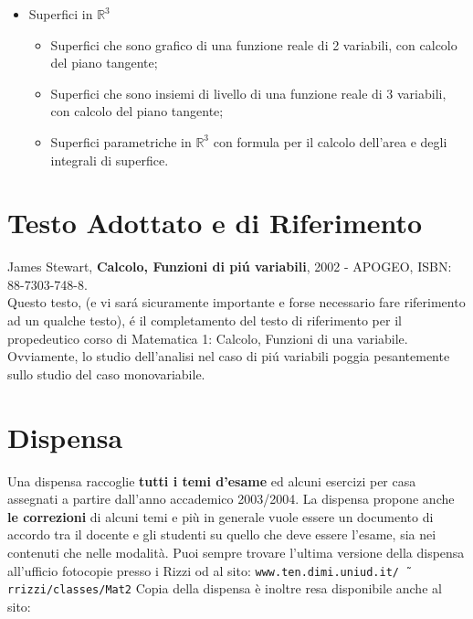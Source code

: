 \documentclass{article}
\begin{document}
\begin{itemize}
\item {\large Superfici in $\mathbb{R}^{3}$}
 \begin{itemize}
    \item Superfici che sono grafico di una funzione reale di 2 variabili,
          con calcolo del piano tangente;
    \item Superfici che sono insiemi di livello di una funzione reale di 3 variabili,
          con calcolo del piano tangente;
    \item Superfici parametriche in $\mathbb{R}^{3}$ con formula per il calcolo
          dell'area e degli integrali di superfice. 
 \end{itemize}

\end{itemize}



\section*{Testo Adottato e di Riferimento}

\indent

   James Stewart,
   {\bf Calcolo, Funzioni di pi\'u variabili},
   2002 - APOGEO, ISBN: 88-7303-748-8.\\
         Questo testo, (e vi sar\'a sicuramente importante e forse
         necessario fare riferimento ad un qualche testo),
         \'e il completamento del testo di riferimento
         per il propedeutico corso di Matematica 1: Calcolo, Funzioni di una variabile.
         Ovviamente, lo studio dell'analisi nel caso di pi\'u variabili poggia pesantemente
         sullo studio del caso monovariabile.


\section*{Dispensa}

Una dispensa raccoglie {\bf tutti i temi d'esame} ed alcuni esercizi
per casa assegnati a partire dall'anno accademico 2003/2004.
La dispensa propone anche {\bf le correzioni} di alcuni temi
e pi\`u in generale vuole essere un documento
di accordo tra il docente e gli studenti su quello che deve
essere l'esame, sia nei contenuti che nelle modalit\`a.
Puoi sempre trovare l'ultima versione della dispensa
all'ufficio fotocopie presso i Rizzi od al sito:
          {\tt www.ten.dimi.uniud.it/\~\,rrizzi/classes/Mat2}
Copia della dispensa \`e inoltre
resa disponibile anche al sito:
\end{document}
